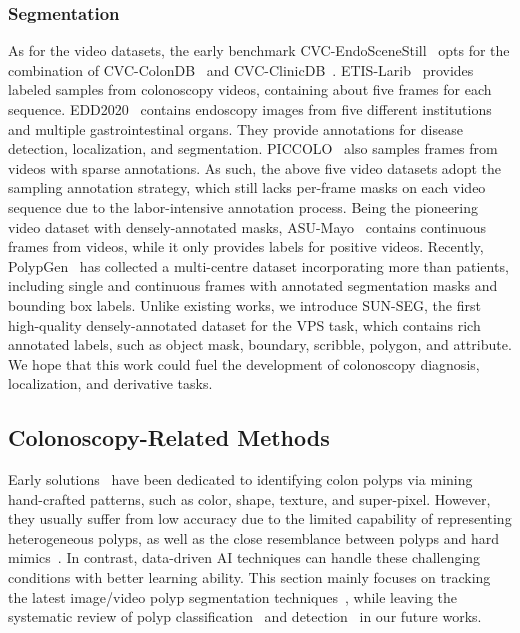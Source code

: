 \documentclass[default,iicol]{sn-jnl}
\theoremstyle{thmstyleone}
\theoremstyle{thmstyletwo}
\theoremstyle{thmstylethree}
\def\ourdataset{SUN-SEG}
\begin{document}
\subsubsection{Segmentation}
As for the video datasets, the early benchmark CVC-EndoSceneStill~\cite{vazquez2017benchmark} opts for the combination of CVC-ColonDB~\cite{bernal2012towards} and CVC-ClinicDB~\cite{bernal2015wm}.
ETIS-Larib~\cite{silva2014toward} provides  labeled samples from  colonoscopy videos, containing about five frames for each sequence.
EDD2020~\cite{ali2020endoscopy} contains  endoscopy images from five different institutions and multiple gastrointestinal organs.
They provide annotations for disease detection, localization, and segmentation.
PICCOLO~\cite{sanchez2020piccolo} also samples  frames from  videos with sparse annotations.
As such, the above five video datasets adopt the sampling annotation strategy, which still lacks per-frame masks on each video sequence due to the labor-intensive annotation process.
Being the pioneering video dataset with densely-annotated masks, ASU-Mayo~\cite{tajbakhsh2015automated} contains  continuous frames from  videos, while it only provides  labels for  positive videos.
Recently, PolypGen~\cite{ali2021polypgen} has collected a multi-centre dataset incorporating more than  patients, including single and continuous frames with  annotated segmentation masks and bounding box labels.
Unlike existing works, we introduce \ourdataset, the first high-quality densely-annotated dataset for the VPS task, which contains rich annotated labels, such as object mask, boundary, scribble, polygon, and attribute.
We hope that this work could fuel the development of colonoscopy diagnosis, localization, and derivative tasks.

\subsection{Colonoscopy-Related Methods}\label{sec:related_works_approaches}
Early solutions~\cite{bernal2012towards,dhandra2006analysis,mamonov2014automated,maghsoudi2017superpixel} have been dedicated to identifying colon polyps via mining hand-crafted patterns, such as color, shape, texture, and super-pixel.
However, they usually suffer from low accuracy due to the limited capability of representing heterogeneous polyps, as well as the close resemblance between polyps and hard mimics~\cite{yu2016integrating}.
In contrast, data-driven AI techniques can handle these challenging conditions with better learning ability.
This section mainly focuses on tracking the latest image/video polyp segmentation techniques~\cite{tavanapong2022artificial}, while leaving the systematic review of polyp classification~\cite{gammulle2020two,carneiro2020deep} and detection~\cite{zhang2018polyp,wu2021multi} in our future works.
\end{document}
